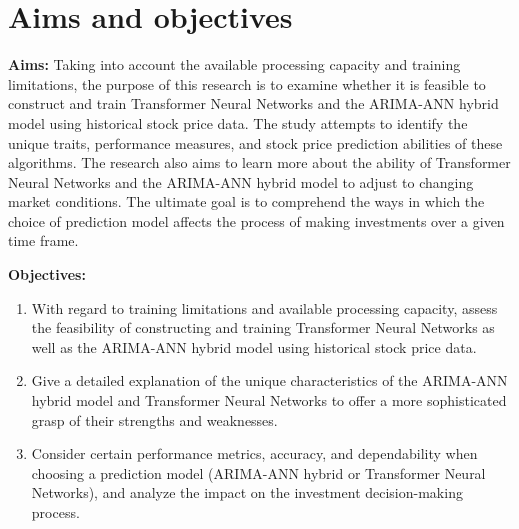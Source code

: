 \section{Aims and objectives}
\label{sec:intro_aims_obj}


\textbf{Aims:} 
Taking into account the available processing capacity and training limitations, the purpose of this research is to examine whether it is feasible to construct and train Transformer Neural Networks and the ARIMA-ANN hybrid model using historical stock price data. The study attempts to identify the unique traits, performance measures, and stock price prediction abilities of these algorithms. The research also aims to learn more about the ability of Transformer Neural Networks and the ARIMA-ANN hybrid model to adjust to changing market conditions. The ultimate goal is to comprehend the ways in which the choice of prediction model affects the process of making investments over a given time frame.


\textbf{Objectives:} 
    \label{sec:first objective}
    \begin{enumerate}
        \item With regard to training limitations and available processing capacity, assess the feasibility of constructing and training Transformer Neural Networks as well as the ARIMA-ANN hybrid model using historical stock price data.
        \item Give a detailed explanation of the unique characteristics of the ARIMA-ANN hybrid model and Transformer Neural Networks to offer a more sophisticated grasp of their strengths and weaknesses.
        \item Consider certain performance metrics, accuracy, and dependability when choosing a prediction model (ARIMA-ANN hybrid or Transformer Neural Networks), and analyze the impact on the investment decision-making process.
    \end{enumerate}





